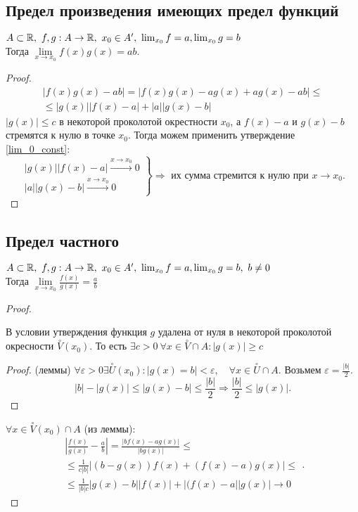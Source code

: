 \documentclass[12pt]{report}
\begin{document}
\subsection{Предел произведения имеющих предел функций}\label{ques_22}
\begin{st}
    $A \subset \mathbb{R}, ~f, g: A \to \mathbb{R}, ~ x_0 \in A' , ~ \lim_{x_0} f= a, \lim_{x_0} g =b$\\
    Тогда $\lim\limits_{x \to  x_0} f(x) g(x) = ab$.
\end{st}
\begin{proof}
    \[
	\begin{array}{c}
	    |f(x)g(x) -ab| = |f(x)g(x) - a g(x) + a g(x) - ab| \le \\
	    \le |g(x)||f(x)-a| + |a||g(x) - b|
    \end{array}
   \] 
   $|g(x)| \le c$ в некоторой проколотой окрестности $x_0$, а $f(x) - a$ и $g(x) -b$ стремятся к нулю в точке $x_0$. Тогда можем применить утверждение \ref{lim_0_const}:
   \[
   \left .
   \begin{array}{l}
       |g(x)||f(x) - a|  \stackrel{x \to  x_0} \longrightarrow  0\\
       |a||g(x) - b|  \stackrel{x \to  x_0} \longrightarrow  0
   \end{array}
   \right \} \Rightarrow \mbox{ их сумма стремится к нулю при $x \to x_0$}
   .\] 
\end{proof}
\subsection{Предел частного}\label{ques_23}
\begin{st}
    $A \subset \mathbb{R}, ~f, g: A \to \mathbb{R}, ~ x_0 \in A' , ~ \lim_{x_0} f= a, \lim_{x_0} g =b, ~b\ne 0$\\
    Тогда $\lim\limits_{x \to x_0}  \frac{f(x)}{g(x)} = \frac{a}{b}$
\end{st}
\begin{proof}
    \begin{lm}
	В условии утверждения функция $g$ удалена от нуля в некоторой проколотой окресности  $\stackrel \circ V(x_0)$. То есть $\exists c > 0 ~\forall x \in \stackrel \circ V \cap A : |g(x)| \ge c$
    \end{lm}
    \begin{proof}{(леммы)}
	$\forall \varepsilon >0 \exists \stackrel \circ U(x_0) : |g(x) = b| < \varepsilon , \quad \forall  x \in \stackrel \circ U \cap A$. Возьмем $\varepsilon =\frac{|b|}{2}$. \[
	    |b| - |g(x)| \le |g(x) - b| \le \frac{|b|}{2} \Longrightarrow \frac{|b|}{2} \le |g(x)|
	.\] 
    \end{proof}
    $\forall x \in \stackrel \circ V(x_0) \cap A$ (из леммы):
    \[
    \begin{array}{c}
	|\frac{f(x)}{g(x)} - \frac{a}{b}| = \frac{|b f(x) - a g(x)|}{|b g(x)|} \le \\
	\le \frac{1}{c |b|} |(b-g(x))f(x) + (f(x) - a) g(x)| \le\\
	\le\frac{1}{|b|c} |g(x) - b| |f(x)| + |(f(x) - a||g(x)| \longrightarrow 0
    \end{array}
    .\] 
\end{proof}
\end{document}
